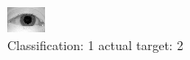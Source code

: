 \begin{figure}[h!]
\begin{center}
\includegraphics[width=0.60\columnwidth]{figures/ID894_class_1_target_2.png}
\end{center}
\caption{ Classification: 1 actual target: 2}
\label{fig:ID894_class_1_target_2}
\end{figure}
